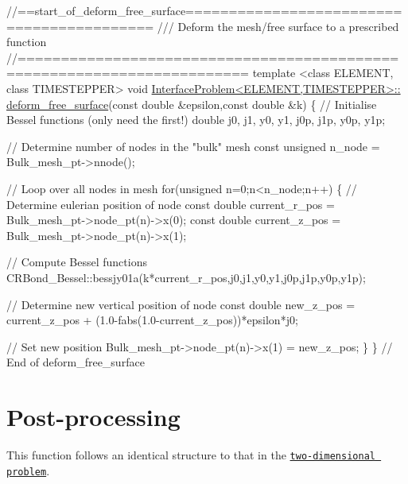 \begin{DoxyCodeInclude}
\textcolor{comment}{//==start\_of\_deform\_free\_surface==========================================}
\textcolor{comment}{/// Deform the mesh/free surface to a prescribed function}
\textcolor{comment}{}\textcolor{comment}{//========================================================================}
\textcolor{keyword}{template} <\textcolor{keyword}{class} ELEMENT, \textcolor{keyword}{class} TIMESTEPPER>
\textcolor{keywordtype}{void} \hyperlink{classInterfaceProblem_aa93d492461ac53f0d9f88516bce322dc}{InterfaceProblem<ELEMENT,TIMESTEPPER>::}
\hyperlink{classInterfaceProblem_aa93d492461ac53f0d9f88516bce322dc}{deform\_free\_surface}(\textcolor{keyword}{const} \textcolor{keywordtype}{double} &epsilon,\textcolor{keyword}{const} \textcolor{keywordtype}{double} &k)
\{
 \textcolor{comment}{// Initialise Bessel functions (only need the first!)}
 \textcolor{keywordtype}{double} j0, j1, y0, y1, j0p, j1p, y0p, y1p;

 \textcolor{comment}{// Determine number of nodes in the "bulk" mesh}
 \textcolor{keyword}{const} \textcolor{keywordtype}{unsigned} n\_node = Bulk\_mesh\_pt->nnode();
 
 \textcolor{comment}{// Loop over all nodes in mesh}
 \textcolor{keywordflow}{for}(\textcolor{keywordtype}{unsigned} n=0;n<n\_node;n++)
  \{
   \textcolor{comment}{// Determine eulerian position of node}
   \textcolor{keyword}{const} \textcolor{keywordtype}{double} current\_r\_pos = Bulk\_mesh\_pt->node\_pt(n)->x(0);
   \textcolor{keyword}{const} \textcolor{keywordtype}{double} current\_z\_pos = Bulk\_mesh\_pt->node\_pt(n)->x(1);
   
   \textcolor{comment}{// Compute Bessel functions}
   CRBond\_Bessel::bessjy01a(k*current\_r\_pos,j0,j1,y0,y1,j0p,j1p,y0p,y1p);
   
   \textcolor{comment}{// Determine new vertical position of node}
   \textcolor{keyword}{const} \textcolor{keywordtype}{double} new\_z\_pos = current\_z\_pos
    + (1.0-fabs(1.0-current\_z\_pos))*epsilon*j0;
   
   \textcolor{comment}{// Set new position}
   Bulk\_mesh\_pt->node\_pt(n)->x(1) = new\_z\_pos;
  \}
\} \textcolor{comment}{// End of deform\_free\_surface}

\end{DoxyCodeInclude}




 

\hypertarget{index_doc}{}\section{Post-\/processing}\label{index_doc}
This function follows an identical structure to that in the \href{../../../navier_stokes/two_layer_interface/html/index.html#doc}{\tt two-\/dimensional problem}.



